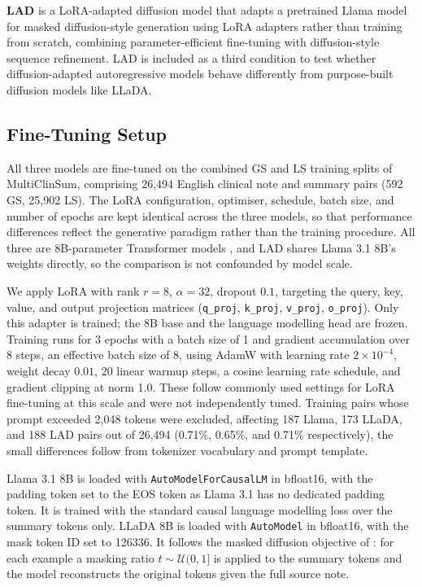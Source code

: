 \documentclass[11pt]{article}
\begin{document}
\textbf{LAD} \citep{kuiper2025lad} is a LoRA-adapted diffusion model
that adapts a pretrained Llama model for masked diffusion-style generation
using LoRA adapters rather than training from scratch, combining
parameter-efficient fine-tuning with diffusion-style sequence refinement.
LAD is included as a third condition to test whether diffusion-adapted
autoregressive models behave differently from purpose-built diffusion
models like LLaDA.

\subsection{Fine-Tuning Setup}
\label{sec:finetuning}

All three models are fine-tuned on the combined GS and LS training splits of
MultiClinSum, comprising 26,494 English clinical note and summary pairs (592 GS,
25,902 LS). The LoRA configuration, optimiser, schedule, batch size, and number of
epochs are kept identical across the three models, so that performance differences
reflect the generative paradigm rather than the training procedure. All three are
8B-parameter Transformer models \citep{nie2025llada, dubey2024llama}, and LAD shares
Llama 3.1 8B's weights directly, so the comparison is not confounded by model scale.

We apply LoRA \citep{hu2022lora} with rank $r = 8$, $\alpha = 32$, dropout $0.1$,
targeting the query, key, value, and output projection matrices (\texttt{q\_proj},
\texttt{k\_proj}, \texttt{v\_proj}, \texttt{o\_proj}). Only this adapter is trained;
the 8B base and the language modelling head are frozen. Training runs for 3 epochs
with a batch size of 1 and gradient accumulation over 8 steps, an effective batch
size of 8, using AdamW with learning rate $2 \times 10^{-4}$, weight decay $0.01$,
20 linear warmup steps, a cosine learning rate schedule, and gradient clipping at
norm 1.0. These follow commonly used settings for LoRA fine-tuning at this scale and
were not independently tuned. Training pairs whose prompt exceeded 2,048 tokens were
excluded, affecting 187 Llama, 173 LLaDA, and 188 LAD pairs out of 26,494 (0.71\%,
0.65\%, and 0.71\% respectively), the small differences follow from tokenizer
vocabulary and prompt template.

Llama 3.1 8B is loaded with \texttt{AutoModelForCausalLM} in bfloat16, with the
padding token set to the EOS token as Llama 3.1 has no dedicated padding token. It
is trained with the standard causal language modelling loss over the summary tokens
only. LLaDA 8B is loaded with \texttt{AutoModel} in bfloat16, with the mask token ID
set to 126336. It follows the masked diffusion objective of \citet{nie2025llada}:
for each example a masking ratio $t \sim \mathcal{U}(0, 1]$ is applied to the summary
tokens and the model reconstructs the original tokens given the full source note.
\end{document}
